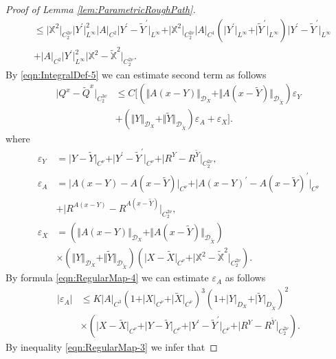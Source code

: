 \documentclass[11pt,a4paper,leqno]{amsart}%
\theoremstyle{plain}
\theoremstyle{remark}
\theoremstyle{plain}
\numberwithin{equation}{section}
\newcommand{\eps}{\varepsilon}
\begin{document}
\begin{proof}[ Proof of Lemma \ref{lem:ParametricRoughPath}]
\begin{align}
&\leq
\vert \mathbb{X}^2\vert_{C_2^{2\nu}}\vert Y^\prime\vert_{L^{\infty}}^2\vert A\vert_{C^2}\vert Y^\prime-\tilde{Y}^\prime\vert_{L^{\infty}}
+\vert \mathbb{X}^2\vert_{C_2^{2\nu}}\vert A\vert_{C^1}(\vert Y^\prime\vert_{L^{\infty}}+\vert \tilde{Y}^\prime\vert_{L^{\infty}})\vert Y^\prime-\tilde{Y}^\prime\vert_{L^{\infty}}\nonumber\\
&+\vert A\vert_{C^2}\vert Y^\prime\vert_{L^{\infty}}^2\vert \mathbb{X}^2-\mathbb{\tilde{X}}^2\vert_{C_2^{2\nu}}.\quad\nonumber
\end{align}
By \eqref{eqn:IntegralDef-5} we can estimate second term as
follows
\begin{equation}
\label{eqn:PRaux-3}
\begin{aligned}
\vert Q^x-\tilde{Q}^x\vert_{C_2^{3\nu}}&\leq
C\Big[(\Vert A(x-Y)\Vert_{\mathcal{D}_X}+\Vert A(x-\tilde{Y})\Vert_{\mathcal{D}_{\tilde{X}}})\eps_Y\nonumber\\
&+
(\Vert Y\Vert_{\mathcal{D}_X}+\Vert \tilde{Y}\Vert_{\mathcal{D}_{\tilde{X}}})\eps_A+\eps_X\Big].
\end{aligned}
\end{equation}
where
\begin{align*}
\eps_Y&=\vert Y-\tilde{Y}\vert_{C^{\nu}}+\vert Y^\prime-\tilde{Y}^\prime\vert_{C^{\nu}}+\vert R^Y-R^{\tilde{Y}}\vert_{C_2^{2\nu}},\\
\eps_A&=\vert A(x-Y)-A(x-\tilde{Y})\vert_{C^{\nu}}+\vert A(x-Y)^\prime-A(x-\tilde{Y})^\prime\vert_{C^{\nu}}\\
&+\vert R^{A(x-Y)}-R^{A(x-\tilde{Y})}\vert_{C_2^{2\nu}},\\
\eps_X&=(\Vert A(x-Y)\Vert_{\mathcal{D}_X}+\Vert A(x-\tilde{Y})\Vert_{\mathcal{D}_{\tilde{X}}})\\
&\times(\Vert Y\Vert_{\mathcal{D}_X}+\Vert \tilde{Y}\Vert_{\mathcal{D}_{\tilde{X}}})
(\vert X-\tilde{X}\vert_{C^{\nu}}+\vert \mathbb{X}^2-\mathbb{\tilde{X}}^2\vert_{C_2^{2\nu}}).
\end{align*}
By formula \eqref{eqn:RegularMap-4} we can estimate $\eps_A$ as
follows
\begin{align}
\vert \eps_A\vert &\leq
K\vert A\vert_{C^3}(1+\vert X\vert_{C^{\nu}}+\vert \tilde{X}\vert_{C^{\nu}})^3(1+\vert Y\vert_{D_X}+\vert \tilde{Y}\vert_{D_{\tilde{X}}})^2\nonumber\\
&\times(\vert X-\tilde{X}\vert_{C^{\nu}}+\vert Y-\tilde{Y}\vert_{C^{\nu}}+\vert Y^\prime-\tilde{Y}^\prime\vert_{C^{\nu}}+\vert R^Y-R^{\tilde{Y}}\vert_{C_2^{2\nu}}).\label{eqn:PRaux-4}
\end{align}
By inequality \eqref{eqn:RegularMap-3} we infer that

\end{proof}
\end{document}
